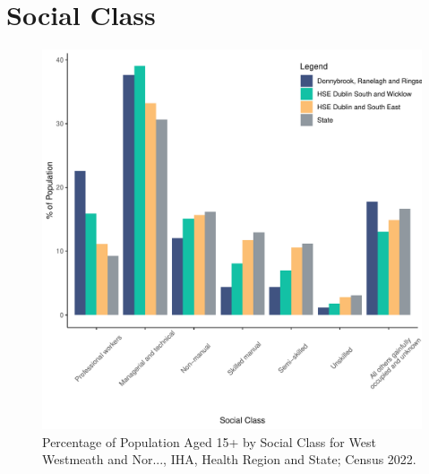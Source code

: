 \documentclass{article}
\begin{document}
\section{Social Class}\label{sect:SC}
\begin{figure}[H]
	\centering
	\includegraphics[width = 140mm]{../figures/SocialClassED.pdf}
	\caption{Percentage of Population Aged 15+ by Social Class for West Westmeath and Nor..., IHA, Health Region and State; Census 2022.}
	\label{fig:vbnv}
	\end{figure}
\end{document}
